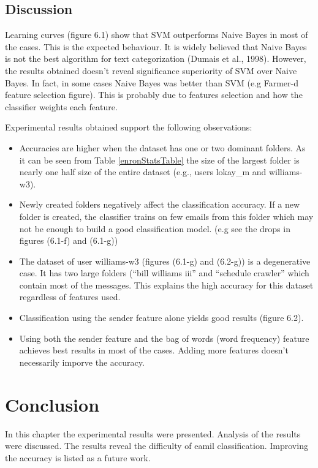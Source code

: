 \subsection{Discussion}
Learning curves (figure 6.1) show that SVM outperforms Naive Bayes in most of the cases. This is the expected behaviour. It is widely believed that Naive Bayes is not the best algorithm for text categorization (Dumais et al., 1998)\cite{DHS98}.
However, the results obtained doesn't reveal significance superiority of SVM over Naive Bayes. In fact, in some cases Naive Bayes was better than SVM (e.g Farmer-d feature selection figure). This is probably due to features selection and how the classifier weights each feature.


Experimental results obtained support the following observations:
\begin{itemize}
\item Accuracies are higher when the dataset has one or two dominant folders. As it can be seen from Table \ref{enronStatsTable}
 the size of the largest folder is nearly one half size of the entire dataset (e.g., users lokay\_m and williams-w3).

\item Newly created folders negatively affect the classification accuracy. If a new folder is created, the classifier trains on few emails from this folder which may not be enough to build a good classification model. (e.g see the drops in figures (6.1-f) and (6.1-g))

\item The dataset of user williams-w3 (figures (6.1-g) and (6.2-g)) is a degenerative case. It has two large folders (``bill williams iii'' and ``schedule crawler'' which contain most of the messages. This explains the high accuracy for this dataset regardless of features used.

\item Classification using the sender feature alone yields good results (figure 6.2).

\item Using both the sender feature and the bag of words (word frequency) feature achieves best results in most of the cases. Adding more features doesn't necessarily imporve the accuracy.

\end{itemize}

\section{Conclusion}
In this chapter the experimental results were presented. Analysis of the results were discussed. The results reveal the difficulty of eamil classification. Improving the accuracy is listed as a future work.

